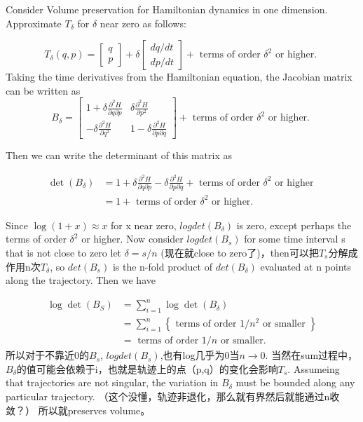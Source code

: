 \documentclass[
]{book}
\theoremstyle{definition}
\theoremstyle{definition}
\theoremstyle{definition}
\theoremstyle{remark}
\begin{document}
Consider Volume preservation for Hamiltonian dynamics in one dimension. Approximate \(T_\delta\) for \(\delta\) near zero as follows:

\[
T_{\delta}(q, p)=\left[ \begin{array}{c}{q} \\ {p}\end{array}\right]+\delta \left[ \begin{array}{l}{d q / d t} \\ {d p / d t}\end{array}\right]+\text { terms of order } \delta^{2} \text { or higher. }
\]
Taking the time derivatives from the Hamiltonian equation, the Jacobian matrix can be written as
\[
B_{\delta}=\left[ \begin{array}{cc}{1+\delta \frac{\partial^{2} H}{\partial q \partial p}} & {\delta \frac{\partial^{2} H}{\partial p^{2}}} \\ {-\delta \frac{\partial^{2} H}{\partial q^{2}}} & {1-\delta \frac{\partial^{2} H}{\partial p \partial q}}\end{array}\right]+\text { terms of order } \delta^{2} \text { or higher. }
\]

Then we can write the determinant of this matrix as

\[
\begin{aligned} \operatorname{det}\left(B_{\delta}\right) &=1+\delta \frac{\partial^{2} H}{\partial q \partial p}-\delta \frac{\partial^{2} H}{\partial p \partial q}+\text { terms of order } \delta^{2} \text { or higher } \\ &=1+\text { terms of order } \delta^{2} \text { or higher. } \end{aligned}
\]

Since \(\log (1+x) \approx x\) for x near zero, \(log det (B_\delta)\) is zero, except perhaps the terms of order \(\delta^2\) or higher. Now consider \(log det (B_s)\) for some time interval s that is not close to zero let \(\delta=s/n\) (现在就close to zero了)，then可以把\(T_s\)分解成作用n次\(T_\delta\), so \(det (B_s)\) is the n-fold product of \(det(B_\delta)\) evaluated at n points along the trajectory. Then we have

\[
\begin{aligned} \log \operatorname{det}\left(B_{S}\right) &=\sum_{i=1}^{n} \log \operatorname{det}\left(B_{\delta}\right) \\ &=\sum_{i=1}^{n}\left\{\text { terms of order } 1 / n^{2} \text { or smaller }\right\} \\ &=\text { terms of order } 1 / n \text { or smaller. } \end{aligned}
\]
所以对于不靠近0的\(B_s\), \(log det (B_s)\),也有log几乎为0当\(n\rightarrow 0\). 当然在sum过程中，\(B_\delta\)的值可能会依赖于i，也就是轨迹上的点（p,q）的变化会影响\(T_s\). Assumeing that trajectories are not singular, the variation in \(B_\delta\) must be bounded along any particular trajectory. （这个没懂，轨迹非退化，那么就有界然后就能通过n收敛？）
所以就preserves volume。
\end{document}
